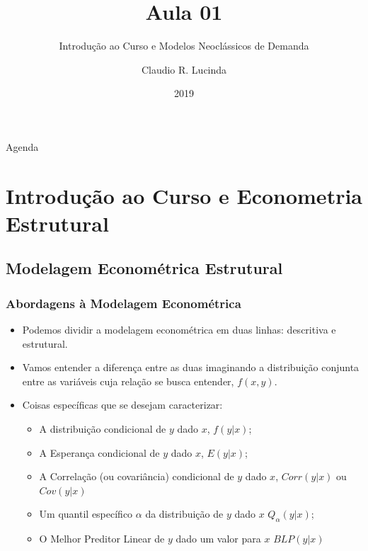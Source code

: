 \documentclass{beamer}
\title{Aula 01}
\subtitle{Introdução ao Curso e Modelos Neoclássicos de Demanda}
\author{Claudio R. Lucinda}
\institute{FEA/USP}
\date{2019}
\begin{document}
\frame{\titlepage}
\begin{frame}{Agenda}
	\tableofcontents[pausesections]
\end{frame}

\section{Introdução ao Curso e Econometria Estrutural}

\subsection{Modelagem Econométrica Estrutural}

\begin{frame}[fragile]\frametitle{Abordagens à Modelagem Econométrica}
\begin{itemize}
  \item Podemos dividir a modelagem econométrica em duas linhas: descritiva e estrutural. 
  \item Vamos entender a diferença entre as duas imaginando a distribuição conjunta entre as variáveis cuja relação se busca entender, $f(x,y)$.
  \item Coisas específicas que se desejam caracterizar:
  \begin{itemize}
    \item A distribuição condicional de $y$ dado $x$, $f(y|x)$;
    \item A Esperança condicional de $y$ dado $x$, $E(y|x)$;
    \item A Correlação (ou covariância) condicional de $y$ dado $x$, $Corr(y|x)$ ou $Cov(y|x)$
    \item Um quantil específico $\alpha$ da distribuição de $y$ dado $x$ $Q_{\alpha}(y|x)$;
    \item O Melhor Preditor Linear de $y$ dado um valor para $x$ $BLP(y|x)$
  \end{itemize}
\end{itemize}
\end{frame}
\end{document}
